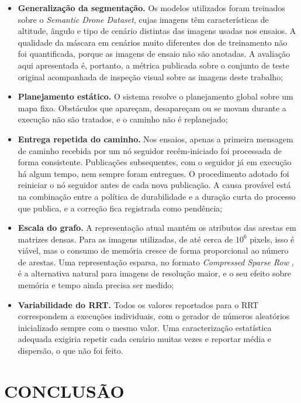 \documentclass[
    12pt,
    openright,
    oneside,
    a4paper,
    english,
    brazil
]{abntex2}
\begin{document}
\begin{itemize}
    \item \textbf{Generalização da segmentação.} Os modelos utilizados foram treinados sobre o \emph{Semantic Drone Dataset}, cujas imagens têm características de altitude, ângulo e tipo de cenário distintas das imagens usadas nos ensaios. A qualidade da máscara em cenários muito diferentes dos de treinamento não foi quantificada, porque as imagens de ensaio não são anotadas. A avaliação aqui apresentada é, portanto, a métrica publicada sobre o conjunto de teste original acompanhada de inspeção visual sobre as imagens deste trabalho;
    \item \textbf{Planejamento estático.} O sistema resolve o planejamento global sobre um mapa fixo. Obstáculos que apareçam, desapareçam ou se movam durante a execução não são tratados, e o caminho não é replanejado;
    \item \textbf{Entrega repetida do caminho.} Nos ensaios, apenas a primeira mensagem de caminho recebida por um nó seguidor recém-iniciado foi processada de forma consistente. Publicações subsequentes, com o seguidor já em execução há algum tempo, nem sempre foram entregues. O procedimento adotado foi reiniciar o nó seguidor antes de cada nova publicação. A causa provável está na combinação entre a política de durabilidade e a duração curta do processo que publica, e a correção fica registrada como pendência;
    \item \textbf{Escala do grafo.} A representação atual mantém os atributos das arestas em matrizes densas. Para as imagens utilizadas, de até cerca de $10^6$ pixels, isso é viável, mas o consumo de memória cresce de forma proporcional ao número de arestas. Uma representação esparsa, no formato \textit{Compressed Sparse Row} \cite{saad2003}, é a alternativa natural para imagens de resolução maior, e o seu efeito sobre memória e tempo ainda precisa ser medido;
    \item \textbf{Variabilidade do RRT.} Todos os valores reportados para o RRT correspondem a execuções individuais, com o gerador de números aleatórios inicializado sempre com o mesmo valor. Uma caracterização estatística adequada exigiria repetir cada cenário muitas vezes e reportar média e dispersão, o que não foi feito.
\end{itemize}

\chapter{CONCLUSÃO}
\label{cap:conclusao}
\end{document}
